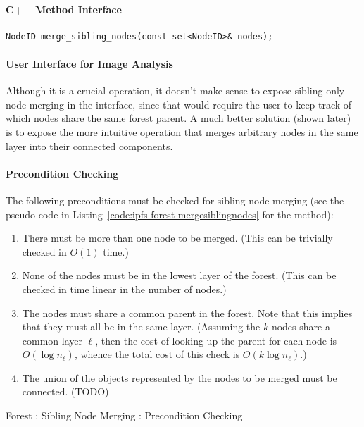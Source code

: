 \paragraph{C++ Method Interface}

\begin{lstlisting}[style=Prototype]
NodeID merge_sibling_nodes(const set<NodeID>& nodes);
\end{lstlisting}

\paragraph{User Interface for Image Analysis}

Although it is a crucial operation, it doesn't make sense to expose sibling-only node merging in the interface, since that would require the user to keep track of which nodes share the same forest parent. A much better solution (shown later) is to expose the more intuitive operation that merges arbitrary nodes in the same layer into their connected components.

\paragraph{Precondition Checking}

The following preconditions must be checked for sibling node merging (see the pseudo-code in Listing~\ref{code:ipfs-forest-mergesiblingnodes} for the method):

\begin{enumerate}

\item There must be more than one node to be merged. (This can be trivially checked in $O(1)$ time.)
\item None of the nodes must be in the lowest layer of the forest. (This can be checked in time linear in the number of nodes.)
\item The nodes must share a common parent in the forest. Note that this implies that they must all be in the same layer. (Assuming the $k$ nodes share a common layer $\ell$, then the cost of looking up the parent for each node is $O(\log n_\ell)$, whence the total cost of this check is $O(k \log n_\ell)$.)
\item The union of the objects represented by the nodes to be merged must be connected. (TODO)

\end{enumerate}

\begin{stulisting}[p]
\caption{Forest : Sibling Node Merging : Precondition Checking}
\label{code:ipfs-forest-mergesiblingnodes}

\end{stulisting}

